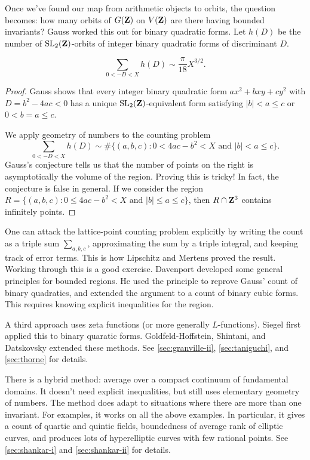 Once we've found our map from arithmetic objects to orbits, the question 
becomes: how many orbits of $G(\mathbf{Z})$ on $V(\mathbf{Z})$ are there having bounded 
invariants? Gauss worked this out for binary quadratic forms. Let $h(D)$ be 
the number of $\operatorname{SL}_2(\mathbf{Z})$-orbits of integer binary quadratic forms of 
discriminant $D$. 

\begin{theo}
\[
  \sum_{0<-D<X} h(D) \sim \frac{\pi}{18} X^{3/2} .
\]
\end{theo}
\begin{proof}
Gauss shows that every integer binary quadratic form $a x^2+b x y+c y^2$ 
with $D=b^2-4 a c<0$ has a unique $\operatorname{SL}_2(\mathbf{Z})$-equivalent form 
satisfying $|b|<a\leqslant c$ or $0<b=a\leqslant c$. 

We apply geometry of numbers to the counting problem 
\[
  \sum_{0<-D<X} h(D) \sim \# \{(a,b,c):0<4 a c-b^2<X\text{ and }|b|<a\leqslant c\} .
\]
Gauss's conjecture tells us that the number of points on the right is 
asymptotically the volume of the region. Proving this is tricky! In fact, the 
conjecture is false in general. If we consider the region 
$R=\{(a,b,c):0\leqslant 4 a c-b^2<X\text{ and }|b|\leqslant a \leqslant c\}$, 
then $R\cap \mathbf{Z}^3$ contains infinitely points. 
\end{proof}

One can attack the lattice-point counting problem explicitly by writing the 
count as a triple sum $\sum_{a,b,c}$, approximating the sum by a triple 
integral, and keeping track of error terms. This is how Lipschitz and Mertens 
proved the result. Working through this is a good exercise. Davenport developed 
some general principles for bounded regions. He used the principle to reprove 
Gauss' count of binary quadratics, and extended the argument to a count of 
binary cubic forms. This requires knowing explicit inequalities for the region. 

A third approach uses zeta functions (or more generally $L$-functions). 
Siegel first applied this to binary quaratic forms. Goldfeld-Hoffstein, 
Shintani, and Datskovsky extended these methods. See 
\autoref{sec:granville-ii}, \autoref{sec:taniguchi}, and 
\autoref{sec:thorne} for details. 

There is a hybrid method: average over a compact continuum of fundamental 
domains. It doesn't need explicit inequalities, but still uses elementary 
geometry of numbers. The method does adapt to situations where there are more 
than one invariant. For examples, it works on all the above examples. In 
particular, it gives a count of quartic and quintic fields, boundedness of 
average rank of elliptic curves, and produces lots of hyperelliptic curves with 
few rational points. See \autoref{sec:shankar-i} and \autoref{sec:shankar-ii} 
for details. 

